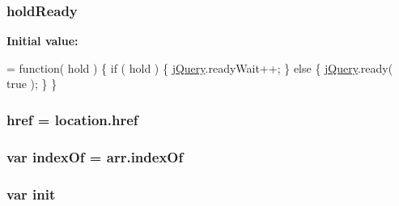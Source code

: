 \subsubsection[{\texorpdfstring{hold\+Ready}{holdReady}}]{ hold\+Ready}\hypertarget{jquery-3_82_81_8js_a551f58116e29e1744dd3bea8e611eb9f}{}\label{jquery-3_82_81_8js_a551f58116e29e1744dd3bea8e611eb9f}
{\bfseries Initial value\+:}
\begin{DoxyCode}
= \textcolor{keyword}{function}( hold ) \{
    \textcolor{keywordflow}{if} ( hold ) \{
        \hyperlink{jquery-3_82_81_8js_a609525712f1102566c2b03866ceb2bba}{jQuery}.readyWait++;
    \} \textcolor{keywordflow}{else} \{
        \hyperlink{jquery-3_82_81_8js_a609525712f1102566c2b03866ceb2bba}{jQuery}.ready( \textcolor{keyword}{true} );
    \}
\}
\end{DoxyCode}
\subsubsection[{\texorpdfstring{href}{href}}]{ href = location.\+href}\hypertarget{jquery-3_82_81_8js_a29e0e1d39cac181b9afc0dcce2ffdcc9}{}\label{jquery-3_82_81_8js_a29e0e1d39cac181b9afc0dcce2ffdcc9}
\subsubsection[{\texorpdfstring{index\+Of}{indexOf}}]{\setlength{\rightskip}{0pt plus 5cm}var index\+Of = arr.\+index\+Of}\hypertarget{jquery-3_82_81_8js_a2b42b59c40371ac6f69bdd12a58bdf7d}{}\label{jquery-3_82_81_8js_a2b42b59c40371ac6f69bdd12a58bdf7d}
\subsubsection[{\texorpdfstring{init}{init}}]{\setlength{\rightskip}{0pt plus 5cm}var init}\hypertarget{jquery-3_82_81_8js_a8925a317299daf39d8500f1e56e5216b}{}\label{jquery-3_82_81_8js_a8925a317299daf39d8500f1e56e5216b}
